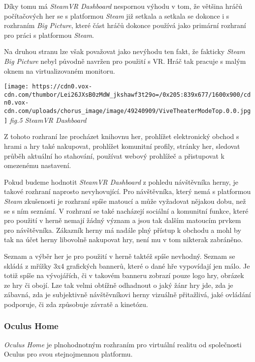 Díky tomu má \emph{SteamVR Dashboard} nespornou výhodu v tom, že většina
hráčů počítačových her se s platformou \emph{Steam} již setkala a
setkala se dokonce i s rozhraním \emph{Big Picture}, které část hráčů
dokonce používá jako primární rozhraní pro práci s platformou
\emph{Steam}.

Na druhou stranu lze však považovat jako nevýhodu ten fakt, že fakticky
\emph{Steam Big Picture} nebyl původně navržen pro použití s VR. Hráč
tak pracuje s malým oknem na virtualizovaném monitoru.

\texttt{[image: https://cdn0.vox-cdn.com/thumbor/Lei26JXsB0zMdW\_jkshawf3t29o=/0x205:839x677/1600x900/cdn0.vox-cdn.com/uploads/chorus\_image/image/49240909/ViveTheaterModeTop.0.0.jpg]}
\emph{fig.5 SteamVR Dashboard}

Z tohoto rozhraní lze procházet knihovnu her, prohlížet elektronický
obchod s hrami a hry také nakupovat, prohlížet komunitní profily,
stránky her, sledovat průběh aktuální ho stahování, používat webový
prohlížeč a přistupovat k omezenému nastavení.

Pokud budeme hodnotit \emph{SteamVR Dashboard} z pohledu návštěvníka
herny, je takové rozhraní naprosto nevyhovující. Pro návštěvníka, který
nemá s platformou \emph{Steam} zkušenosti je rozhraní spíše matoucí a
může vyžadovat nějakou dobu, než se s ním seznámí. V rozhraní se také
nacházejí sociální a komunitní funkce, které pro použití v herně nemají
žádný význam a jsou tak dalším matoucím prvkem pro návštěvníka. Zákazník
herny má nadále plný přístup k obchodu a mohl by tak na účet herny
libovolně nakupovat hry, není mu v tom nikterak zabráněno.

Seznam a výběr her je pro použití v herně taktéž spíše nevhodný. Seznam
se skládá z mřížky 3x4 grafických bannerů, které o dané hře vypovídají
jen málo. Je totiž spíše na vývojářích, či v takovém banneru zobrazí
pouze logo hry, obrázek ze hry či obojí. Lze tak velmi obtížně odhadnout
o jaký žánr hry jde, zda je zábavná, zda je subjektivně návštěvníkovi
herny vizuálně přitažlivá, jaké ovládání podporuje, či zda způsobuje
závratě a kinetózu.

\subsubsection{Oculus Home}\label{oculus-home}

\emph{Oculus Home} je plnohodnotným rozhraním pro virtuální realitu od
společnosti Oculus pro svou stejnojmennou platformu.

